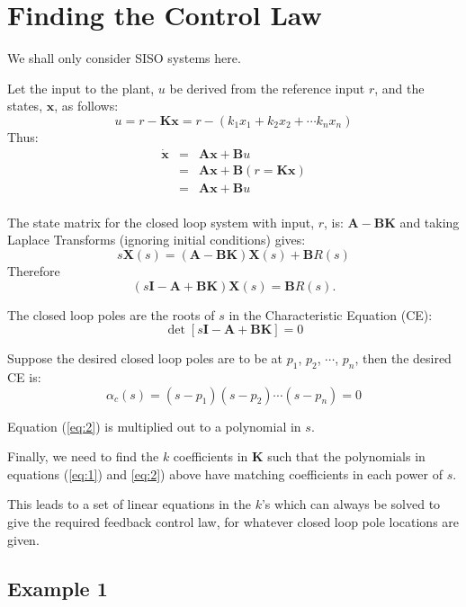 \section*{Finding the Control Law} %
\label{sec:finding_the_control_law}

We shall only consider SISO systems here.

Let the input to the plant, $u$ be derived from the reference input $r$, and the states, $\mathbf{x}$, as follows:
\[
u=r-\mathbf{Kx}=r-(k_1x_1+k_2x_2+\cdots k_nx_n)
\]
Thus:
\begin{eqnarray*}
	\dot{\mathbf{x}} & = & \mathbf{Ax}+\mathbf{B}u \\
	                 & = & \mathbf{Ax}+\mathbf{B}(r = \mathbf{Kx}) \\
	                 & = & \mathbf{Ax}+\mathbf{B}u \\	
\end{eqnarray*} 

The state matrix for the closed loop system with input, $r$,  is:  $\mathbf{A}-\mathbf{BK}$ and taking Laplace Transforms  (ignoring initial conditions) gives:
\[
	s\mathbf{X}(s) = (\mathbf{A}-\mathbf{BK})\mathbf{X}(s) + \mathbf{B}R(s)
\]
Therefore 
\[
    (s\mathbf{I}-\mathbf{A}+\mathbf{BK})\mathbf{X}(s) = \mathbf{B}R(s).
\]

The closed loop poles are the roots of $s$ in the Characteristic Equation (CE):
\begin{equation}
	\label{eq:1}
	\det\left[s\mathbf{I}-\mathbf{A}+\mathbf{BK}\right]=0
\end{equation}
 
Suppose the desired closed loop poles are to be at $p_1$, $p_2$, $\cdots$, $p_n$, then the desired CE is:
\begin{equation}
	\label{eq:2}
	\alpha_c(s) = (s-p_1)(s-p_2)\cdots(s-p_n)=0
\end{equation} 

Equation (\ref{eq:2}) is multiplied out to a polynomial in $s$.

Finally, we need to find the $k$  coefficients in $\mathbf{K}$ such that the polynomials in equations  (\ref{eq:1})  and  \ref{eq:2}) above have matching coefficients in each power of $s$.

This leads to a set of linear equations in the $k$'s  which can always be solved to give the required feedback control law, for whatever closed loop pole locations are given.

\subsection*{Example 1} %
\label{sub:example_1}

